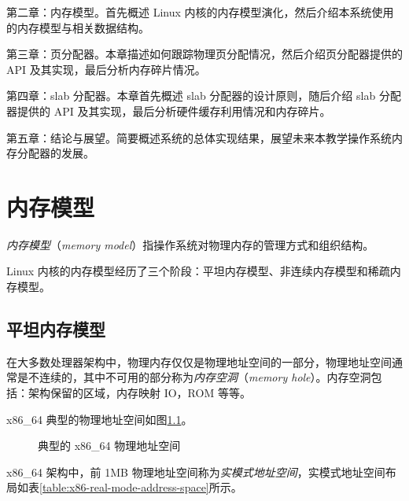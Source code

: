 \documentclass[AutoFakeBold]{LZUThesis}
\begin{document}
\begin{sloppypar}
第二章：内存模型。首先概述 Linux 内核的内存模型演化，然后介绍本系统使用的内存模型与相关数据结构。

第三章：页分配器。本章描述如何跟踪物理页分配情况，然后介绍页分配器提供的
API 及其实现，最后分析内存碎片情况。

第四章：slab 分配器。本章首先概述 slab 分配器的设计原则，随后介绍 slab
分配器提供的 API 及其实现，最后分析硬件缓存利用情况和内存碎片。

第五章：结论与展望。简要概述系统的总体实现结果，展望未来本教学操作系统内存分配器的发展。



\chapter{内存模型}

\emph{内存模型}（\emph{memory
model}）指操作系统对物理内存的管理方式和组织结构。

Linux
内核的内存模型经历了三个阶段：平坦内存模型、非连续内存模型和稀疏内存模型。


\section{平坦内存模型}

在大多数处理器架构中，物理内存仅仅是物理地址空间的一部分，物理地址空间通常是不连续的，其中不可用的部分称为\emph{内存空洞}（\emph{memory
hole}）。内存空洞包括：架构保留的区域，内存映射 IO，ROM 等等。

x86\_64 典型的物理地址空间如图\ref{figure:x86_64-physical-address-space}。

\begin{figure}
\centering

\caption{典型的 x86\_64 物理地址空间}
\label{figure:x86_64-physical-address-space}
\end{figure}

x86\_64 架构中，前 1MB
物理地址空间称为\emph{实模式地址空间}，实模式地址空间布局如表\ref{table:x86-real-mode-address-space}所示。


\end{sloppypar}
\end{document}
